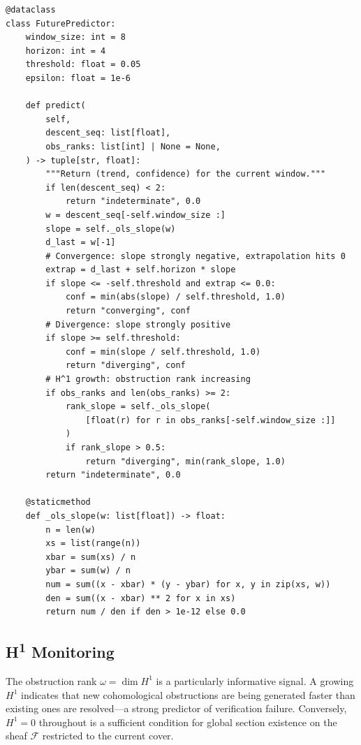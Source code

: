 \documentclass[11pt]{article}
\newcommand{\ObsRank}{\omega}               %
\newcommand{\HOne}{H^1}                     %
\begin{document}
\begin{lstlisting}[style=jugeo-python, caption={FuturePredictor: core prediction logic.}]
@dataclass
class FuturePredictor:
    window_size: int = 8
    horizon: int = 4
    threshold: float = 0.05
    epsilon: float = 1e-6

    def predict(
        self,
        descent_seq: list[float],
        obs_ranks: list[int] | None = None,
    ) -> tuple[str, float]:
        """Return (trend, confidence) for the current window."""
        if len(descent_seq) < 2:
            return "indeterminate", 0.0
        w = descent_seq[-self.window_size :]
        slope = self._ols_slope(w)
        d_last = w[-1]
        # Convergence: slope strongly negative, extrapolation hits 0
        extrap = d_last + self.horizon * slope
        if slope <= -self.threshold and extrap <= 0.0:
            conf = min(abs(slope) / self.threshold, 1.0)
            return "converging", conf
        # Divergence: slope strongly positive
        if slope >= self.threshold:
            conf = min(slope / self.threshold, 1.0)
            return "diverging", conf
        # H^1 growth: obstruction rank increasing
        if obs_ranks and len(obs_ranks) >= 2:
            rank_slope = self._ols_slope(
                [float(r) for r in obs_ranks[-self.window_size :]]
            )
            if rank_slope > 0.5:
                return "diverging", min(rank_slope, 1.0)
        return "indeterminate", 0.0

    @staticmethod
    def _ols_slope(w: list[float]) -> float:
        n = len(w)
        xs = list(range(n))
        xbar = sum(xs) / n
        ybar = sum(w) / n
        num = sum((x - xbar) * (y - ybar) for x, y in zip(xs, w))
        den = sum((x - xbar) ** 2 for x in xs)
        return num / den if den > 1e-12 else 0.0
\end{lstlisting}

\subsection{H\textsuperscript{1} Monitoring}

The obstruction rank $\ObsRank = \dim \HOne$ is a particularly informative
signal.  A growing $\HOne$ indicates that new cohomological obstructions
are being generated faster than existing ones are resolved—a strong
predictor of verification failure.  Conversely, $\HOne = 0$ throughout
is a sufficient condition for global section existence on the sheaf
$\mathcal{F}$ restricted to the current cover.
\end{document}
